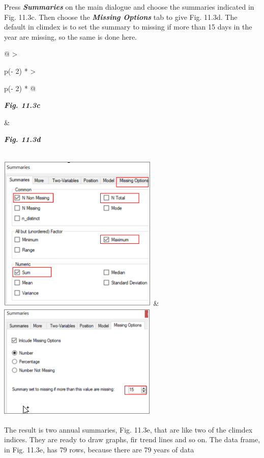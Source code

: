 \documentclass[
  letterpaper,
  DIV=11,
  numbers=noendperiod]{scrreprt}
\begin{document}
Press \textbf{\emph{Summaries}} on the main dialogue and choose the
summaries indicated in Fig. 11.3c. Then choose the \textbf{\emph{Missing
Options}} tab to give Fig. 11.3d. The default in climdex is to set the
summary to missing if more than 15 days in the year are missing, so the
same is done here.

\begin{longtable}[]{@{}
  >{\raggedright\arraybackslash}p{(\columnwidth - 2\tabcolsep) * }
  >{\raggedright\arraybackslash}p{(\columnwidth - 2\tabcolsep) * }@{}}
\toprule\noalign{}
\begin{minipage}[b]{\linewidth}\raggedright
\textbf{\emph{Fig. 11.3c}}
\end{minipage} & \begin{minipage}[b]{\linewidth}\raggedright
\textbf{\emph{Fig. 11.3d}}
\end{minipage} \\
\midrule\noalign{}
\endhead
\bottomrule\noalign{}
\endlastfoot
\includegraphics[width=3.00805in,height=2.94734in]{figures/Fig11.3c.png}
&
\includegraphics[width=2.98272in,height=2.19917in]{figures/Fig11.3d.png} \\
\end{longtable}

The result is two annual summaries, Fig. 11.3e, that are like two of the
climdex indices. They are ready to draw graphs, fir trend lines and so
on. The data frame, in Fig. 11.3e, has 79 rows, because there are 79
years of data
\end{document}
